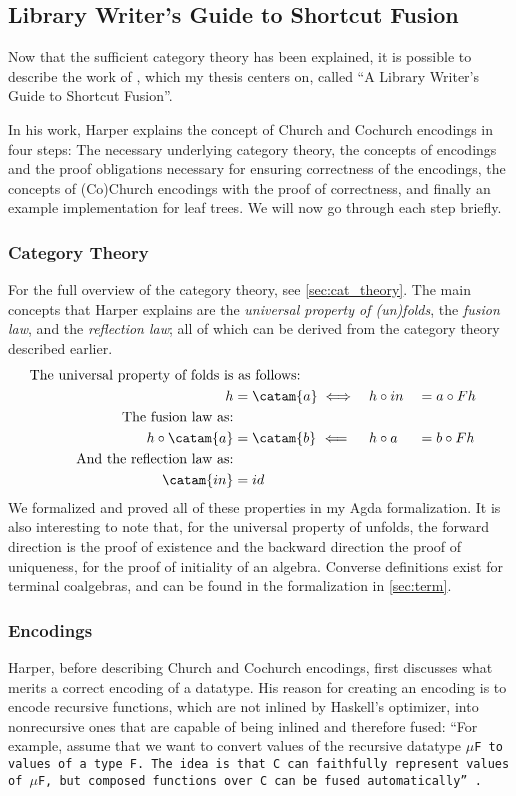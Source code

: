 \subsection{Library Writer's Guide to Shortcut Fusion}\label{sec:libfusion}
Now that the sufficient category theory has been explained, it is possible to describe the work of \cite{Harper2011}, which my thesis centers on, called ``A Library Writer's Guide to Shortcut Fusion''.

In his work, Harper explains the concept of Church and Cochurch encodings in four steps:
The necessary underlying category theory, the concepts of encodings and the proof obligations necessary for ensuring correctness of the encodings, the concepts of (Co)Church encodings with the proof of correctness, and finally an example implementation for leaf trees.
We will now go through each step briefly.
\subsubsection{Category Theory}
For the full overview of the category theory, see \autoref{sec:cat_theory}.
The main concepts that Harper explains are the \textit{universal property of (un)folds}, the \textit{fusion law}, and the \textit{reflection law}; all of which can be derived from the category theory described earlier.
\begin{alignat*}{3}
\text{The universal property of folds is}&\text{ as follows:} \\
h &= \catam{a} \iff && h \circ in &&= a \circ F h \\
\text{The fusion law as:} \\
h \circ \catam{a} &= \catam{b}~\Longleftarrow && h \circ a &&= b \circ F h \\
\text{And the reflection law as:} \\
\catam{in} &= id
\end{alignat*}
We formalized and proved all of these properties in my Agda formalization.
It is also interesting to note that, for the universal property of unfolds, the forward direction is the proof of existence and the backward direction the proof of uniqueness, for the proof of initiality of an algebra.
Converse definitions exist for terminal coalgebras, and can be found in the formalization in \autoref{sec:term}.

\subsubsection{Encodings}\label{sec:obligations}
Harper, before describing Church and Cochurch encodings, first discusses what merits a correct encoding of a datatype.
His reason for creating an encoding is to encode recursive functions, which are not inlined by Haskell's optimizer, into nonrecursive ones that are capable of being inlined and therefore fused:
``For example, assume that we want to convert values of the recursive datatype \tt{$\mu$F} to values of a type \tt{F}.  The idea is that \tt{C} can faithfully represent values of \tt{$\mu$F}, but composed functions over \tt{C} can be fused automatically'' \citep{Harper2011}.


